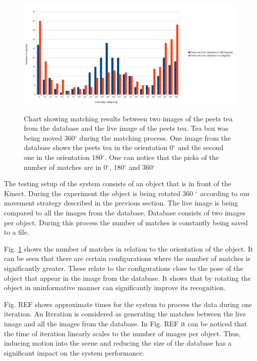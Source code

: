 \begin{figure}

\includegraphics[width=1.3\columnwidth]{figures/recognition-results.png}\\


\caption{Chart showing matching results between two images of the peets tea from the database and the live image of the peets tea. Tea box was being moved 360$^\circ$ during the matching process. One image from the database shows the peets tea in the orientation 0$^\circ$ and the second one in the orientation 180$^\circ$. One can notice that the picks of the number of matches are in 0$^\circ$, 180$^\circ$ and 360$^\circ$}
\label{fig:recognition-results}
\end{figure}
The testing setup of the system consists of an object that is in front of the Kinect. During the experiment the object is being rotated 360 $^\circ$ according to our movement strategy described in the previous section. The live image is being compared to all the images from the database. Database consists of two images per object. During this process the number of matches is constantly being saved to a file.

Fig. \ref{fig:recognition-results} shows the number of matches in relation to the orientation of the object. It can be seen that there are certain configurations where the number of matches is significantly greater. These relate to the configurations close to the pose of the object that appear in the image from the database. It shows that by rotating the object in uninformative manner can significantly improve its recognition. 

Fig. REF shows approximate times for the system to process the data during one iteration. An Iteration is considered as generating the matches between the live image and all the images from the database. In Fig. REF it can be noticed that the time of iteration linearly scales to the number of images per object. Thus, inducing motion into the scene and reducing the size of the database has a significant impact on the system performance.





